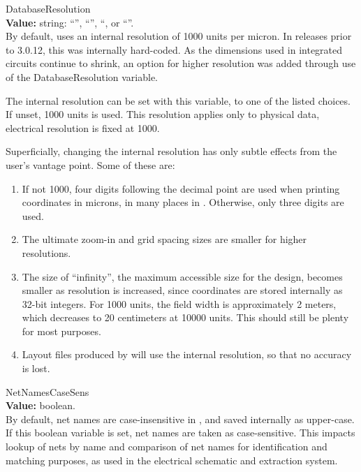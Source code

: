 \begin{description}
\item{\et DatabaseResolution}\\
{\bf Value:} string: ``{}'', ``{}'', ``{},
 or ``{}''.\\
By default, {\Xic} uses an internal resolution of 1000 units per
micron.  In releases prior to 3.0.12, this was internally hard-coded. 
As the dimensions used in integrated circuits continue to shrink, an
option for higher resolution was added through use of the {\et
DatabaseResolution} variable.

The internal resolution can be set with this variable, to one of the
listed choices.  If unset, 1000 units is used.  This resolution
applies only to physical data, electrical resolution is fixed at 1000.

Superficially, changing the internal resolution has only subtle
effects from the user's vantage point.  Some of these are:

\begin{enumerate}
\item{If not 1000, four digits following the decimal point are used
when printing coordinates in microns, in many places in {\Xic}.
Otherwise, only three digits are used.}

\item{The ultimate zoom-in and grid spacing sizes are smaller for
higher resolutions.}

\item{The size of ``infinity'', the maximum accessible size for the
design, becomes smaller as resolution is increased, since coordinates
are stored internally as 32-bit integers.  For 1000 units, the field
width is approximately 2 meters, which decreases to 20 centimeters at
10000 units.  This should still be plenty for most purposes.}

\item{Layout files produced by {\Xic} will use the internal
resolution, so that no accuracy is lost.}
\end{enumerate}

\item{\et NetNamesCaseSens}\\
{\bf Value:} boolean.\\
By default, net names are case-insensitive in {\Xic}, and saved
internally as upper-case.  If this boolean variable is set, net names
are taken as case-sensitive.  This impacts lookup of nets by name and
comparison of net names for identification and matching purposes, as
used in the electrical schematic and extraction system.


\end{description}
